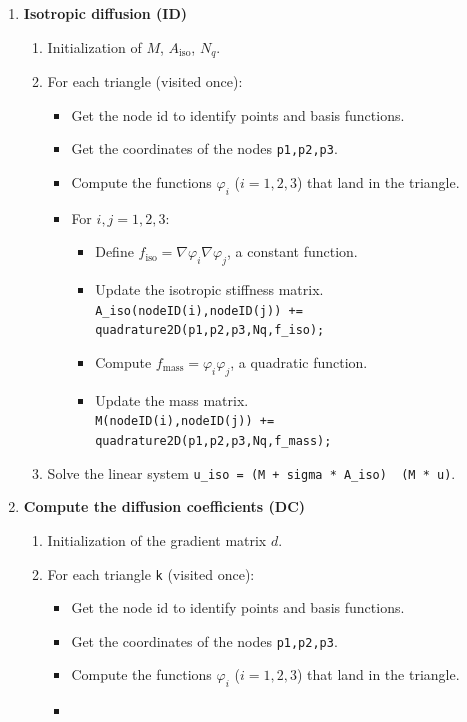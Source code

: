 \documentclass{report}
\renewcommand\phi{\varphi}
\newcommand\bslash{\symbol{`\\}}
\def\iso{\text{iso}}
\def\mass{\text{mass}}
\begin{document}
\begin{enumerate}
	\item
	\textbf{Isotropic diffusion (ID)}
	\begin{enumerate}	
		\item 
		Initialization of $M$, $A_\iso$, $N_q$.
		\item 
		For each triangle (visited once):
		\begin{itemize}
			\item
			Get the node id to identify points and basis functions.
			\item 
			Get the coordinates of the nodes \texttt{p1,p2,p3}.
			\item 
			Compute the functions $\phi_i$ ($i=1,2,3$) that land in the triangle.
			\item 
			For $i,j=1,2,3$:
			\begin{itemize}
				\item
				Define $f_\iso = \nabla \phi_i \nabla \phi_j$, a constant function.
				\item
				Update the isotropic stiffness matrix.\\
				\texttt{A\_iso(nodeID(i),nodeID(j)) += quadrature2D(p1,p2,p3,Nq,f\_iso);}
				\item
				Compute $f_\mass = \phi_i \phi_j$, a quadratic function.
				\item
				Update the mass matrix. \\
				\texttt{M(nodeID(i),nodeID(j)) += quadrature2D(p1,p2,p3,Nq,f\_mass);}
			\end{itemize}
		\end{itemize}
		\item 
		Solve the linear system \texttt{u\_iso = (M + sigma * A\_iso) \bslash\ (M * u)}.
	\end{enumerate}
	\item
	\textbf{Compute the diffusion coefficients (DC)}
	\begin{enumerate}
		\item 
		Initialization of the gradient matrix $d$.
		\item 
		For each triangle \texttt{k} (visited once):
		\begin{itemize}
			\item
			Get the node id to identify points and basis functions.
			\item 
			Get the coordinates of the nodes \texttt{p1,p2,p3}.
			\item 
			Compute the functions $\phi_i$ ($i=1,2,3$) that land in the triangle.
			\item

\end{itemize}
\end{enumerate}
\end{enumerate}
\end{document}
